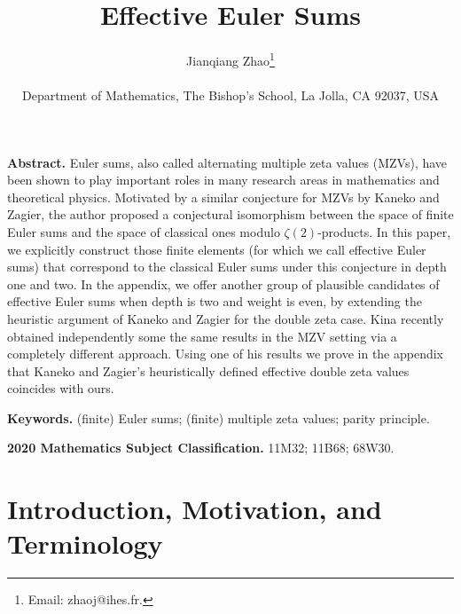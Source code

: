 \documentclass{article}
\theoremstyle{plain}
\theoremstyle{definition}
\begin{document}
\title{Effective Euler Sums}

\author{Jianqiang Zhao\footnote{Email: zhaoj@ihes.fr.}\\
\ \\
Department of Mathematics, The Bishop's School, La Jolla, CA 92037, USA}

\date{}

\maketitle

\medskip
\noindent
\textbf{Abstract.} Euler sums, also called alternating multiple zeta values (MZVs), have been shown to play important roles in many research areas in mathematics and theoretical physics. Motivated by a similar conjecture for MZVs by Kaneko and Zagier, the author proposed a conjectural isomorphism between the space of finite Euler sums and the space of classical ones modulo $\zeta(2)$-products. In this paper, we explicitly construct those finite elements (for which we call effective Euler sums) that correspond to the classical Euler sums under this conjecture in depth one and two. In the appendix, we offer another group of plausible candidates of effective Euler sums when depth is two and weight is even, by extending the heuristic argument of Kaneko and Zagier for the double zeta case. Kina recently obtained independently some the same results in the MZV setting via a completely different approach. Using one of his results we prove in the appendix that Kaneko and Zagier's heuristically defined effective double zeta values coincides with ours.

\medskip
\noindent
\textbf{Keywords.}
(finite) Euler sums; (finite) multiple zeta values; parity principle.

\medskip
\noindent
\textbf{2020 Mathematics Subject Classification.} 11M32; 11B68; 68W30.


\section{Introduction, Motivation, and Terminology}
\end{document}
